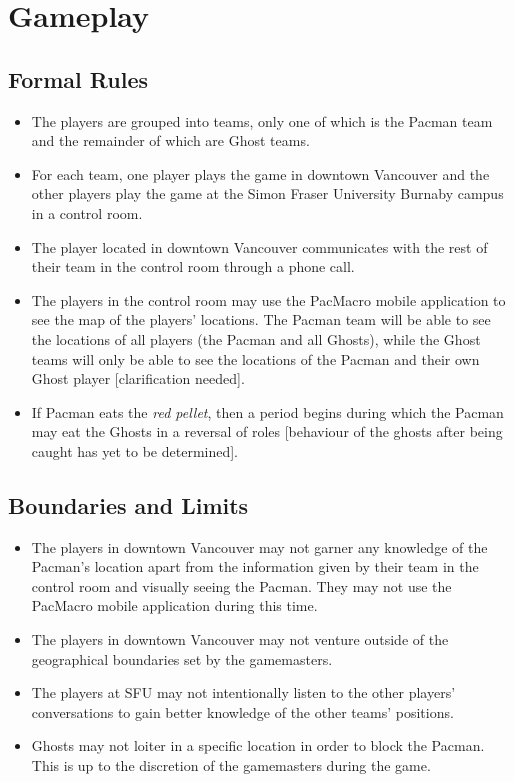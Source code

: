 \documentclass[10pt, oneside, letterpaper, titlepage]{article}
\begin{document}
	\section{Gameplay}
	\label{sec:gameplay}

	\subsection{Formal Rules}
	\label{subsec:gameplay:formal-rules}

	\begin{itemize}
		\item The players are grouped into teams, only one of which is the Pacman team and the remainder of which are Ghost teams.
		\item For each team, one player plays the game in downtown Vancouver and the other players play the game at the Simon Fraser University Burnaby campus in a control room.
		\item The player located in downtown Vancouver communicates with the rest of their team in the control room through a phone call.
		\item The players in the control room may use the PacMacro mobile application to see the map of the players' locations. The Pacman team will be able to see the locations of all players (the Pacman and all Ghosts), while the Ghost teams will only be able to see the locations of the Pacman and their own Ghost player [clarification needed].
		\item If Pacman eats the \emph{red pellet}, then a period begins during which the Pacman may eat the Ghosts in a reversal of roles [behaviour of the ghosts after being caught has yet to be determined].
	\end{itemize}

	\subsection{Boundaries and Limits}
	\label{subsec:gameplay:boundaries-and-limits}

	\begin{itemize}
		\item The players in downtown Vancouver may not garner any knowledge of the Pacman's location apart from the information given by their team in the control room and visually seeing the Pacman. They may not use the PacMacro mobile application during this time.
		\item The players in downtown Vancouver may not venture outside of the geographical boundaries set by the gamemasters.
		\item The players at SFU may not intentionally listen to the other players' conversations to gain better knowledge of the other teams' positions.
		\item Ghosts may not loiter in a specific location in order to block the Pacman. This is up to the discretion of the gamemasters during the game.
	\end{itemize}
\end{document}
